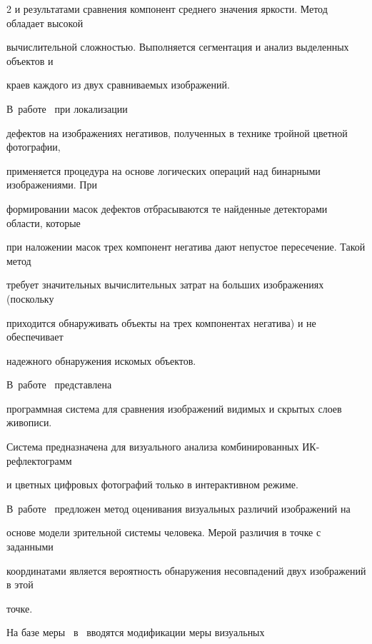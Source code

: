 \begin{multicols}{2}
и результатами сравнения компонент среднего значения яркости. Метод обладает высокой 


вычислительной сложностью. Выполняется сегментация и анализ выделенных объектов и 


краев каждого из двух сравниваемых изображений. 





В~работе~\cite{2mur} при локализации 


дефектов на изоб\-ра\-жениях негативов, полученных в технике тройной цветной фотографии, 


применяется процедура на основе логических операций над бинарными изоб\-ра\-же\-ни\-я\-ми. При 


формировании масок дефектов отбрасываются те найденные детекторами об\-ласти, которые 


при наложении масок трех компонент негатива дают непустое пересечение. Такой метод 


требует значительных вычислительных затрат на больших изображениях (поскольку 


приходится обнаруживать объекты на трех компонентах негатива) и не обеспечивает 


надежного обнаружения искомых объектов. 





В~работе~\cite{6mur} представлена 


программная система для сравнения изображений видимых и скрытых слоев живописи. 


Система предназначена для визуального анализа комбинированных ИК-реф\-лек\-то\-грамм 


и цветных цифровых фотографий только в интерактивном режиме.











  В~работе~\cite{7mur} предложен метод оценивания визуальных различий изображений на 


основе модели зрительной системы человека. Мерой различия в точке с заданными 


координатами является вероятность обнаружения несовпадений двух изоб\-ра\-же\-ний в этой 


точке. 





На базе меры~\cite{7mur} в~\cite{8mur} вводятся модификации меры визуальных 



\end{multicols}
